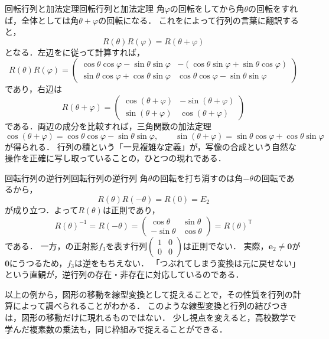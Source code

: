 \begin{example}{回転行列と加法定理}{回転行列と加法定理}
  角$\varphi$の回転をしてから角$\theta$の回転をすれば，全体としては角$\theta + \varphi$の回転になる．
  これをによって行列の言葉に翻訳すると，
  \[
    R(\theta) R(\varphi) = R(\theta + \varphi)
  \]
  となる．左辺をに従って計算すれば，
  \[
    R(\theta)R(\varphi) =
    \begin{pmatrix}
      \cos\theta\cos\varphi - \sin\theta\sin\varphi & -(\cos\theta\sin\varphi + \sin\theta\cos\varphi) \\
      \sin\theta\cos\varphi + \cos\theta\sin\varphi & \cos\theta\cos\varphi - \sin\theta\sin\varphi
    \end{pmatrix}
  \]
  であり，右辺は
  \[
    R(\theta + \varphi) =
    \begin{pmatrix}
      \cos(\theta + \varphi) & -\sin(\theta + \varphi) \\
      \sin(\theta + \varphi) & \cos(\theta + \varphi)
    \end{pmatrix}
  \]
  である．両辺の成分を比較すれば，三角関数の加法定理
  \[
    \cos(\theta + \varphi) = \cos\theta\cos\varphi - \sin\theta\sin\varphi, \qquad
    \sin(\theta + \varphi) = \sin\theta\cos\varphi + \cos\theta\sin\varphi
  \]
  が得られる．
  行列の積という「一見複雑な定義」が，写像の合成という自然な操作を正確に写し取っていることの，ひとつの現れである．
\end{example}

\begin{example}{回転行列の逆行列}{回転行列の逆行列}
  角$\theta$の回転を打ち消すのは角$-\theta$の回転であるから，
  \[
    R(\theta) R(-\theta) = R(0) = E_2
  \]
  が成り立つ．よって$R(\theta)$は正則であり，
  \[
    R(\theta)^{-1} = R(-\theta) = \begin{pmatrix} \cos\theta & \sin\theta \\ -\sin\theta & \cos\theta \end{pmatrix}
    = R(\theta)^\mathsf{T}
  \]
  である．
  一方，の正射影$f_3$を表す行列$\begin{pmatrix} 1 & 0 \\ 0 & 0 \end{pmatrix}$は正則でない．
  実際，$\bm{e}_2 \ne \bm{0}$が$\bm{0}$にうつるため，$f_3$は逆をもちえない．
  「つぶれてしまう変換は元に戻せない」という直観が，逆行列の存在・非存在に対応しているのである．
\end{example}

以上の例から，図形の移動を線型変換として捉えることで，その性質を行列の計算によって調べられることがわかる．
このような線型変換と行列の結びつきは，図形の移動だけに現れるものではない．
少し視点を変えると，高校数学で学んだ複素数の乗法も，同じ枠組みで捉えることができる．

